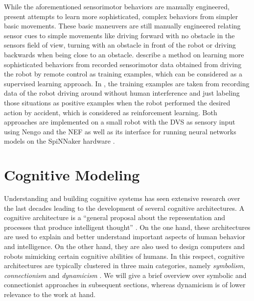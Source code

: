 While the aforementioned sensorimotor behaviors are manually engineered, \textcite{Conradt2014, Stewart2016} present attempts to learn more sophisticated, complex behaviors from simpler basic movements.
These basic maneuvers are still manually engineered relating sensor cues to simple movements like driving forward with no obstacle in the sensors field of view, turning with an obstacle in front of the robot or driving backwards when being close to an obstacle.
\textcite{Conradt2014} describe a method on learning more sophisticated behaviors from recorded sensorimotor data obtained from driving the robot by remote control as training examples, which can be considered as a supervised learning approach.
In \textcite{Stewart2016}, the training examples are taken from recording data of the robot driving around without human interference and just labeling those situations as positive examples when the robot performed the desired action by accident, which is considered as reinforcement learning.
Both approaches are implemented on a small robot with the \ac{DVS} as sensory input using \ac{Nengo} and the \ac{NEF} as well as its interface \parencite{Mundy2015} for running neural networks models on the \ac{SpiNNaker} hardware \parencite{Furber2014}.

\section{Cognitive Modeling}%
\label{sec:cognitive_modeling}

Understanding and building cognitive systems has seen extensive research over the last decades leading to the development of several cognitive architectures.
A cognitive architecture is a \enquote{general proposal about the representation and processes that produce intelligent thought} \parencite{Thagard2012}.
On the one hand, these architectures are used to explain and better understand important aspects of human behavior and intelligence.
On the other hand, they are also used to design computers and robots mimicking certain cognitive abilities of humans.
In this respect, cognitive architectures are typically clustered in three main categories, namely \emph{symbolism}, \emph{connectionism} and \emph{dynamicism} \parencite{Eliasmith2013}.
We will give a brief overview over symbolic and connectionist approaches in subsequent sections, whereas dynamicism \parencite{Schoener2008} is of lower relevance to the work at hand.

